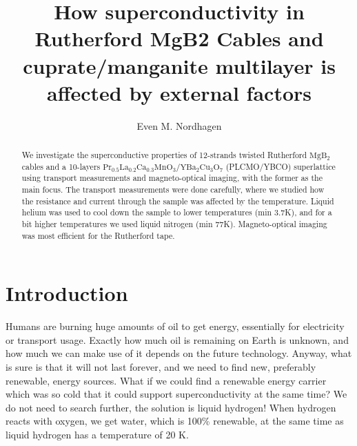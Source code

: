 \documentclass{comjnl}
\newcommand*\chem[1]{\ensuremath{\mathrm{#1}}}
\begin{document}
\title[Superconductivity in Rutherford MgB2 Cables and cuprate/manganite multilayer]{How superconductivity in Rutherford MgB2 Cables and cuprate/manganite multilayer is affected by external factors}
\author{Even M. Nordhagen}
 

 




\begin{abstract}
We investigate the superconductive properties of 12-strands twisted Rutherford \chem{MgB_2} cables and a 10-layers \chem{Pr_{0.5}La_{0.2}Ca_{0.3}MnO_3/YBa_2Cu_3O_7} (PLCMO/YBCO) superlattice using transport measurements and magneto-optical imaging, with the former as the main focus. The transport measurements were done carefully, where we studied how the resistance and current through the sample was affected by the temperature. Liquid helium was used to cool down the sample to lower temperatures (min 3.7K), and for a bit higher temperatures we used liquid nitrogen (min 77K).  Magneto-optical imaging was most efficient for the Rutherford tape.
\end{abstract}

\maketitle


\section{Introduction}
Humans are burning huge amounts of oil to get energy, essentially for electricity or transport usage. Exactly how much oil is remaining on Earth is unknown, and how much we can make use of it depends on the future technology. Anyway, what is sure is that it will not last forever, and we need to find new, preferably renewable, energy sources. What if we could find a renewable energy carrier which was so cold that it could support superconductivity at the same time? We do not need to search further, the solution is liquid hydrogen! When hydrogen reacts with oxygen, we get water, which is 100\% renewable, at the same time as liquid hydrogen has a temperature of 20 K.
\end{document}
